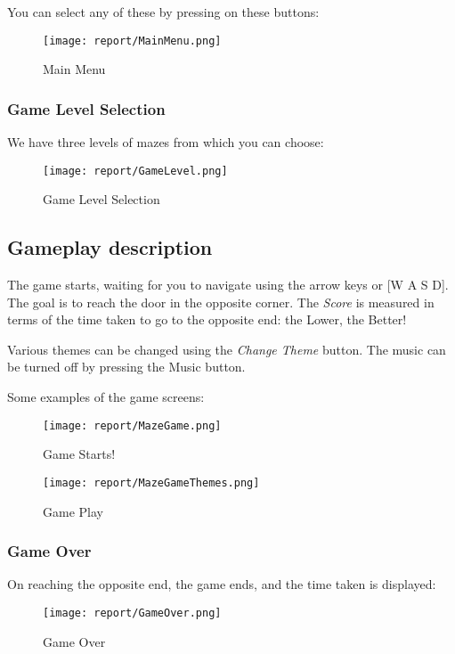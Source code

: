 \documentclass{article}
\begin{document}
You can select any of these by pressing on these buttons:

\begin{figure}[h]
    \centering
    \texttt{[image: report/MainMenu.png]}
    \caption{Main Menu}
\end{figure}

\subsubsection{Game Level Selection}
We have three levels of mazes from which you can choose:

\begin{figure}[h]
    \centering
    \texttt{[image: report/GameLevel.png]}
    \caption{Game Level Selection}
\end{figure}

\subsection{Gameplay description}
The game starts, waiting for you to navigate using the arrow keys or [W A S D]. The goal is to reach the door in the opposite corner. The \textit{Score} is measured in terms of the time taken to go to the opposite end: the Lower, the Better!

Various themes can be changed using the \textit{Change Theme} button. The music can be turned off by pressing the Music button.

Some examples of the game screens:

\begin{figure}[h]
    \centering
    \texttt{[image: report/MazeGame.png]}
    \caption{Game Starts!}
\end{figure}

\begin{figure}[h]
    \centering
    \texttt{[image: report/MazeGameThemes.png]}
    \caption{Game Play}
\end{figure}

\subsubsection{Game Over}
On reaching the opposite end, the game ends, and the time taken is displayed:

\begin{figure}[h]
    \centering
    \texttt{[image: report/GameOver.png]}
    \caption{Game Over}
\end{figure}
\end{document}
